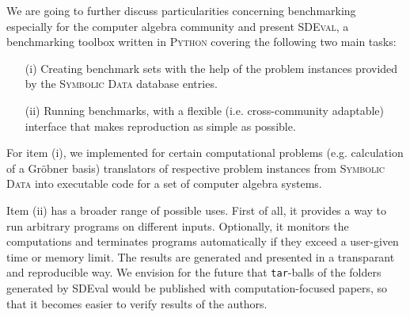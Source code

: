 \documentclass[oribibl,11pt]{article}
\begin{document}
We are going to further discuss particularities concerning
benchmarking especially for the computer algebra community and
present \textsc{SDEval}, a benchmarking toolbox written in
\textsc{Python} covering the following two main tasks:
\begin{itemize}

  \item[(i)] Creating benchmark sets with the help of the problem
    instances provided by the \textsc{Symbolic Data} database entries.
  \item[(ii)] Running benchmarks, with a flexible
    (i.e. cross-community adaptable) interface that makes reproduction
    as simple as possible.
\end{itemize}

For item (i), we implemented for certain computational problems
(e.g. calculation of a Gr\"obner basis) translators of respective
problem instances from \textsc{Symbolic Data} into executable code for a
set of computer algebra systems.


Item (ii) has a broader range of possible uses. First of all, it
provides a way to run arbitrary programs on different
inputs. Optionally, it monitors the computations and terminates
programs automatically if they exceed a user-given time or memory
limit.
The results are generated and presented in a transparant and
reproducible way. We envision for the future
that \texttt{tar}-balls of the folders generated by SDEval would be published with
computation-focused papers, so that it becomes easier to verify
results of the authors.
\end{document}
